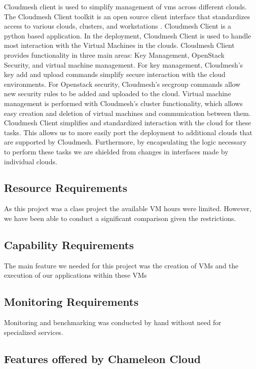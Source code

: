 \documentclass[sigconf]{acmart}
\begin{document}
Cloudmesh client is used to simplify management of vms across
different clouds.  The Cloudmesh Client toolkit is an open source
client interface that standardizes access to various clouds, clusters,
and workstations \cite{www-cloudmesh}.  Cloudmesh Client is a python
based application. In the deployment, Cloudmesh Client is used to
handle most interaction with the Virtual Machines in the
clouds. Cloudmesh Client provides functionality in three main areas:
Key Management, OpenStack Security, and virtual machine management.
For key management, Cloudmesh's key add and upload commands simplify
secure interaction with the cloud environments.  For Openstack
security, Cloudmesh's secgroup commands allow new security rules to be
added and uploaded to the cloud.  Virtual machine management is
performed with Cloudmesh's cluster functionality, which allows easy
creation and deletion of virtual machines and communication between
them.  Cloudmesh Client simplifies and standardized interaction with
the cloud for these tasks.  This allows us to more easily port the
deployment to additional clouds that are supported by Cloudmesh.
Furthermore, by encapsulating the logic necessary to perform these
tasks we are shielded from changes in interfaces made by individual
clouds.

\subsection{Resource Requirements}

As this project was a class project the available VM hours were
limited. However, we have been able to conduct a significant
comparison given the restrictions.

\subsection{Capability Requirements}

The main feature we needed for this project was the creation of VMs and
the execution of our applications within these VMs

\subsection{Monitoring Requirements}

Monitoring and benchmarking was conducted by hand without need for
specialized services. 

\subsection{Features offered by Chameleon Cloud}
\end{document}
